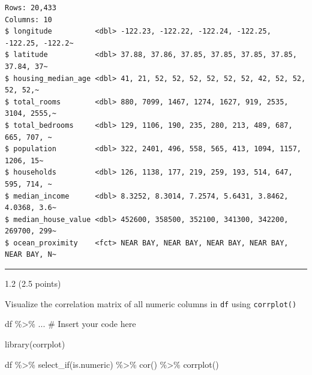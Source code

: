 \documentclass[
  letterpaper,
  DIV=11,
  numbers=noendperiod]{scrartcl}
\newenvironment{Shaded}{\begin{snugshade}}{\end{snugshade}}
\newcommand{\CommentTok}[1]{\textcolor[rgb]{0.37,0.37,0.37}{#1}}
\newcommand{\FunctionTok}[1]{\textcolor[rgb]{0.28,0.35,0.67}{#1}}
\newcommand{\NormalTok}[1]{\textcolor[rgb]{0.00,0.23,0.31}{#1}}
\newcommand{\SpecialCharTok}[1]{\textcolor[rgb]{0.37,0.37,0.37}{#1}}
\begin{document}
\begin{verbatim}
Rows: 20,433
Columns: 10
$ longitude          <dbl> -122.23, -122.22, -122.24, -122.25, -122.25, -122.2~
$ latitude           <dbl> 37.88, 37.86, 37.85, 37.85, 37.85, 37.85, 37.84, 37~
$ housing_median_age <dbl> 41, 21, 52, 52, 52, 52, 52, 52, 42, 52, 52, 52, 52,~
$ total_rooms        <dbl> 880, 7099, 1467, 1274, 1627, 919, 2535, 3104, 2555,~
$ total_bedrooms     <dbl> 129, 1106, 190, 235, 280, 213, 489, 687, 665, 707, ~
$ population         <dbl> 322, 2401, 496, 558, 565, 413, 1094, 1157, 1206, 15~
$ households         <dbl> 126, 1138, 177, 219, 259, 193, 514, 647, 595, 714, ~
$ median_income      <dbl> 8.3252, 8.3014, 7.2574, 5.6431, 3.8462, 4.0368, 3.6~
$ median_house_value <dbl> 452600, 358500, 352100, 341300, 342200, 269700, 299~
$ ocean_proximity    <fct> NEAR BAY, NEAR BAY, NEAR BAY, NEAR BAY, NEAR BAY, N~
\end{verbatim}

\begin{center}\rule{0.5\linewidth}{0.5pt}\end{center}

1.2 (2.5 points)

Visualize the correlation matrix of all numeric columns in \texttt{df}
using \texttt{corrplot()}

\begin{Shaded}
\begin{Highlighting}[]
\NormalTok{df }\SpecialCharTok{\%\textgreater{}\%}\NormalTok{ ... }\CommentTok{\# Insert your code here}
\end{Highlighting}
\end{Shaded}

\begin{Shaded}
\begin{Highlighting}[]
\FunctionTok{library}\NormalTok{(corrplot)}

\NormalTok{df }\SpecialCharTok{\%\textgreater{}\%} 
  \FunctionTok{select\_if}\NormalTok{(is.numeric) }\SpecialCharTok{\%\textgreater{}\%}
  \FunctionTok{cor}\NormalTok{() }\SpecialCharTok{\%\textgreater{}\%}
  \FunctionTok{corrplot}\NormalTok{()}
\end{Highlighting}
\end{Shaded}
\end{document}
